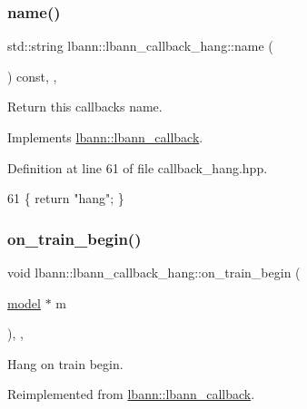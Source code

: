 \subsubsection{\texorpdfstring{name()}{name()}}
{\footnotesize\ttfamily std\+::string lbann\+::lbann\+\_\+callback\+\_\+hang\+::name (\begin{DoxyParamCaption}{ }\end{DoxyParamCaption}) const\hspace{0.3cm}{\ttfamily [inline]}, {\ttfamily [override]}, {\ttfamily [virtual]}}

Return this callback\textquotesingle{}s name. 

Implements \hyperlink{classlbann_1_1lbann__callback_a7522c7a14f1d6a1ea762cc2d7248eb3a}{lbann\+::lbann\+\_\+callback}.



Definition at line 61 of file callback\+\_\+hang.\+hpp.


\begin{DoxyCode}
61 \{ \textcolor{keywordflow}{return} \textcolor{stringliteral}{"hang"}; \}
\end{DoxyCode}
\mbox{\label{classlbann_1_1lbann__callback__hang_ada39fd10375143a26c99e0a32d4368ce}} 
\subsubsection{\texorpdfstring{on\+\_\+train\+\_\+begin()}{on\_train\_begin()}}
{\footnotesize\ttfamily void lbann\+::lbann\+\_\+callback\+\_\+hang\+::on\+\_\+train\+\_\+begin (\begin{DoxyParamCaption}\item[{\hyperlink{classlbann_1_1model}{model} $\ast$}]{m }\end{DoxyParamCaption})\hspace{0.3cm}{\ttfamily [inline]}, {\ttfamily [override]}, {\ttfamily [virtual]}}



Hang on train begin. 



Reimplemented from \hyperlink{classlbann_1_1lbann__callback_a7c8f0d211967ccc5219144e92571ab26}{lbann\+::lbann\+\_\+callback}.



